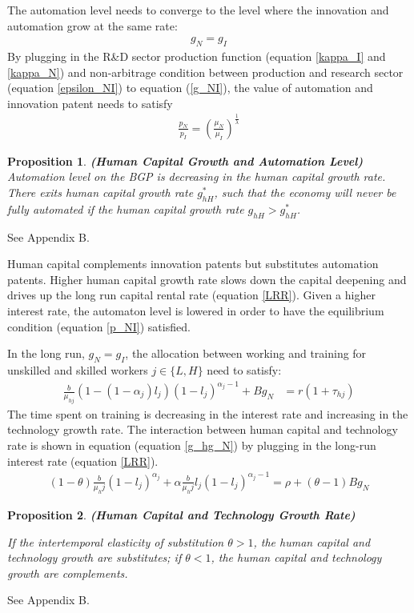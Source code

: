 \documentclass[12pt]{article}
\newtheorem{proposition}{Proposition}
\begin{document}
The automation level needs to converge to the level where the innovation and automation grow at the same rate: 
\begin{align}
\label{g_NI}
g_N = g_I 
\end{align}
By plugging in the R\&D sector production function (equation \ref{kappa_I} and \ref{kappa_N}) and non-arbitrage condition between production and research sector (equation \ref{epsilon_NI}) to equation (\ref{g_NI}), the value of automation and innovation patent needs to satisfy
\begin{align}
\label{p_NI}
\frac{p_N}{p_I} = (\frac{\mu_N}{\mu_I})^{\frac{1}{\lambda}}
\end{align}
\begin{proposition}{\bf (Human Capital Growth and Automation Level)} \\

Automation level on the BGP is decreasing in the human capital growth rate. There exits human capital growth rate $g_{hH}^*$, such that the economy will never be fully automated if the human capital growth rate $g_{hH}>g_{hH}^*$. 
\end{proposition}
 See Appendix B.

Human capital complements innovation patents but substitutes automation patents. Higher human capital growth rate slows down the capital deepening and drives up the long run capital rental rate (equation \ref{LRR}). Given a higher interest rate, the automaton level is lowered in order to have the equilibrium condition (equation \ref{p_NI}) satisfied.

In the long run, $g_N = g_I$, the allocation between working and training for unskilled and skilled workers $j\in\{L,H\}$ need to satisfy:
\begin{align*}
\frac{b}{\mu_{hj}}(1-(1-\alpha_j)l_j)(1-l_j)^{\alpha_j-1}+Bg_N&= r(1+\tau_{hj}) 
\end{align*}
The time spent on training is decreasing in the interest rate and increasing in the technology growth rate. The interaction between human capital and technology rate is shown in equation (equation \ref{g_hg_N}) by plugging in the long-run interest rate (equation \ref{LRR}). 
\begin{align} 
\label{g_hg_N}
(1-\theta)\frac{b}{\mu_hj}(1-l_j)^{\alpha_j}+\alpha\frac{b}{\mu_hj}l_j(1-l_j)^{\alpha_j-1} = \rho+(\theta-1)Bg_N
\end{align}

\begin{proposition}{\bf (Human Capital and Technology Growth Rate)}

If the intertemporal elasticity of substitution $\theta>1$, the human capital and technology growth are substitutes; if $\theta<1$, the human capital and technology growth are complements.
\end{proposition}
 See Appendix B.
\end{document}
